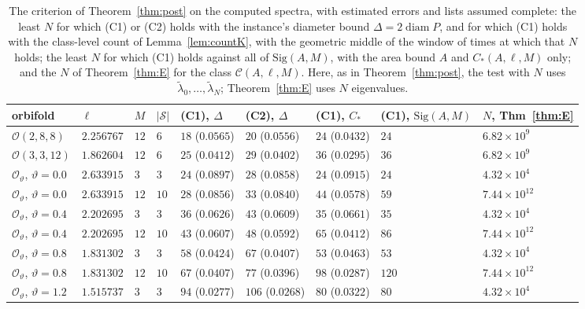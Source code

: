 \documentclass[pdflatex,sn-mathphys-num]{sn-jnl}
\theoremstyle{thmstyleone}%
\theoremstyle{thmstylethree}%
\newcommand{\Orb}{\mathcal{O}}
\newcommand{\Cl}{\mathcal{C}}
\newcommand{\Sig}{\mathrm{Sig}}
\newcommand{\diam}{\operatorname{diam}}
\begin{document}
\begin{table}[t]
\centering\footnotesize
\caption{The criterion of Theorem~\ref{thm:post} on the computed spectra, with estimated errors and lists assumed complete: the least $N$ for which (C1) or (C2) holds with the instance's diameter bound $\Delta=2\diam P$, and for which (C1) holds with the class-level count of Lemma~\ref{lem:countK}, with the geometric middle of the window of times at which that $N$ holds; the least $N$ for which (C1) holds against all of $\Sig(A,M)$, with the area bound $A$ and $C_*(A,\ell,M)$ only; and the $N$ of Theorem~\ref{thm:E} for the class $\Cl(A,\ell,M)$. Here, as in Theorem~\ref{thm:post}, the test with $N$ uses $\tilde\lambda_0,\dots,\tilde\lambda_N$; Theorem~\ref{thm:E} uses $N$ eigenvalues.}\label{tab:practice}
\setlength{\tabcolsep}{2.4pt}\begin{tabular}{@{}lllllllll@{}}
\toprule
orbifold & $\ell$ & $M$ & $|\mathcal S|$ & (C1), $\Delta$ & (C2), $\Delta$ & (C1), $C_*$ & (C1), $\Sig(A,M)$ & $N$, Thm~\ref{thm:E}\\
\midrule
$\Orb(2,8,8)$ & $2.256767$ & $12$ & $6$ & $18$ ($0.0565$) & $20$ ($0.0556$) & $24$ ($0.0432$) & $24$ & $6.82\times10^{9}$\\
$\Orb(3,3,12)$ & $1.862604$ & $12$ & $6$ & $25$ ($0.0412$) & $29$ ($0.0402$) & $36$ ($0.0295$) & $36$ & $6.82\times10^{9}$\\
$\Orb_\vartheta$, $\vartheta=0.0$ & $2.633915$ & $3$ & $3$ & $24$ ($0.0897$) & $28$ ($0.0858$) & $24$ ($0.0915$) & $24$ & $4.32\times10^{4}$\\
$\Orb_\vartheta$, $\vartheta=0.0$ & $2.633915$ & $12$ & $10$ & $28$ ($0.0856$) & $33$ ($0.0840$) & $44$ ($0.0578$) & $59$ & $7.44\times10^{12}$\\
$\Orb_\vartheta$, $\vartheta=0.4$ & $2.202695$ & $3$ & $3$ & $36$ ($0.0626$) & $43$ ($0.0609$) & $35$ ($0.0661$) & $35$ & $4.32\times10^{4}$\\
$\Orb_\vartheta$, $\vartheta=0.4$ & $2.202695$ & $12$ & $10$ & $43$ ($0.0607$) & $48$ ($0.0592$) & $65$ ($0.0412$) & $86$ & $7.44\times10^{12}$\\
$\Orb_\vartheta$, $\vartheta=0.8$ & $1.831302$ & $3$ & $3$ & $58$ ($0.0424$) & $67$ ($0.0407$) & $53$ ($0.0463$) & $53$ & $4.32\times10^{4}$\\
$\Orb_\vartheta$, $\vartheta=0.8$ & $1.831302$ & $12$ & $10$ & $67$ ($0.0407$) & $77$ ($0.0396$) & $98$ ($0.0287$) & $120$ & $7.44\times10^{12}$\\
$\Orb_\vartheta$, $\vartheta=1.2$ & $1.515737$ & $3$ & $3$ & $94$ ($0.0277$) & $106$ ($0.0268$) & $80$ ($0.0322$) & $80$ & $4.32\times10^{4}$\\

\end{tabular}
\end{table}
\end{document}

